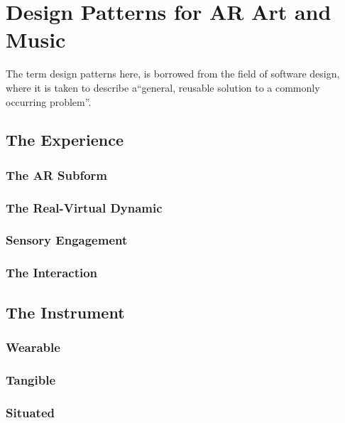 


\section{Design Patterns for AR Art and Music} \label{sec: method-patterns} %

The term design patterns here, is borrowed from the field of software design, where it is taken to describe a``general, reusable solution to a commonly occurring problem''. 

\subsection{The Experience}
\subsubsection{The AR Subform}
\subsubsection{The Real-Virtual Dynamic}
\subsubsection{Sensory Engagement}
\subsubsection{The Interaction}     %

\subsection{The Instrument} %
\subsubsection{Wearable}
\subsubsection{Tangible}
\subsubsection{Situated}

